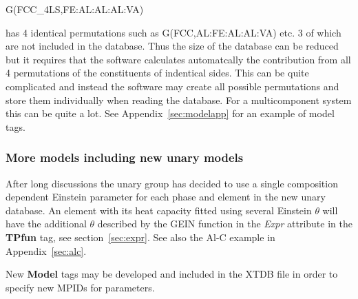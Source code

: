 \documentclass{article}
\begin{document}
G(FCC\_4LS,FE:AL:AL:AL:VA)

\noindent
has 4 identical permutations such as G(FCC,AL:FE:AL:AL:VA) etc. 3 of
which are not included in the database.  Thus the size of the database
can be reduced but it requires that the software calculates
automatcally the contribution from all 4 permutations of the
constituents of indentical sides.  This can be quite complicated and
instead the software may create all possible permutations and store
them individually when reading the database.  For a multicomponent
system this can be quite a lot.  See Appendix~\ref{sec:modelapp} for
an example of model tags.

\subsubsection{More models including new unary models}

After long discussions the unary group has decided to use a single
composition dependent Einstein parameter for each phase and element in
the new unary database.  An element with its heat capacity fitted
using several Einstein $\theta$ will have the additional $\theta$
described by the GEIN function in the {\em Expr} attribute in the {\bf
  TPfun} tag, see section~\ref{sec:expr}.  See also the Al-C example
in Appendix~\ref{sec:alc}.

New {\bf Model} tags may be developed and included in the XTDB file in
order to specify new MPIDs for parameters.
\end{document}
